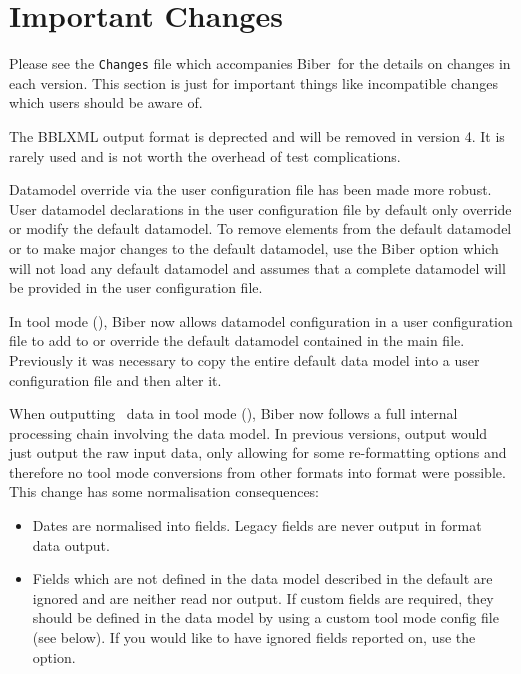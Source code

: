 \documentclass{ltxdockit}
\newcommand*{\biber}{Biber\xspace}
\begin{document}
\printtitlepage
\tableofcontents

\section{Important Changes}\label{special}

Please see the \verb+Changes+ file which accompanies \biber\ for the
details on changes in each version. This section is just for important
things like incompatible changes which users should be aware of.

The BBLXML output format is deprected and will be removed in version 4. It
is rarely used and is not worth the overhead of test complications.

Datamodel override via the user configuration file has been made more
robust. User datamodel declarations in the user configuration file by
default only override or modify the default datamodel. To remove elements
from the default datamodel or to make major changes to the default
datamodel, use the \biber option  which will
not load any default datamodel and assumes that a complete datamodel will
be provided in the user configuration file.

In tool mode (), \biber now allows datamodel configuration in
a user configuration file to add to or override the default datamodel
contained in the main  file. Previously it was
necessary to copy the entire default data model into a user configuration
file and then alter it.

When outputting \bibtex\ data in tool mode (), \biber now
follows a full internal processing chain involving the data model. In
previous versions, \bibtex output would just output the raw
\bibtex input data, only allowing for some re-formatting options and
therefore no tool mode conversions from other formats into \bibtex format
were possible. This change has some normalisation consequences:

\begin{itemize}
\item Dates are normalised into  fields. Legacy
   fields are never output in \bibtex format data output.
\item Fields which are not defined in the data model described in the
  default  are ignored and are neither read nor
  output. If custom fields are required, they should be defined in the data
  model by using a custom tool mode config file (see below). If you would
  like to have ignored fields reported on, use the
   option.
\end{itemize}
\end{document}

